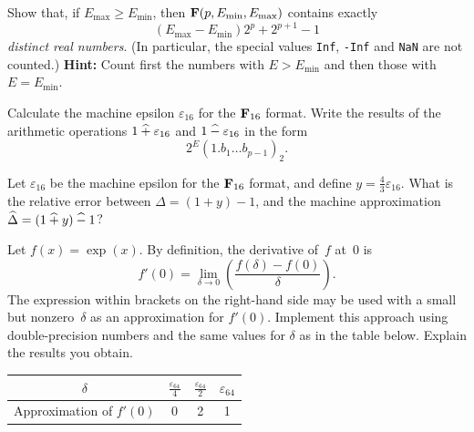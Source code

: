 \begin{exercise}
    \label{exercise:cardinality_floating}
    Show that, if $E_{\max} \geq E_{\min}$, then $\mathbf F(p, E_{\min}, E_{\max})$ contains exactly
    \[
        (E_{\max} - E_{\min}) 2^{p} + 2^{p+1} - 1
    \]
    \emph{distinct real numbers}.
    (In particular, the special values \texttt{Inf}, \texttt{-Inf} and \texttt{NaN} are not counted.)
    \textbf{Hint:} Count first the numbers with $E > E_{\min}$ and then those with $E = E_{\min}$.
\end{exercise}

\begin{exercise}
    Calculate the machine epsilon $\varepsilon_{16}$ for the $\mathbf F_{16}$ format.
    Write the results of the arithmetic operations $1 \mathbin{\widehat +} \varepsilon_{16}$ and $1 \mathbin{\widehat -} \varepsilon_{16}$ in the form
    \[
        2^E (1.b_1 \dotsc b_{p-1})_2.
    \]
\end{exercise}

\begin{exercise}
    Let $\varepsilon_{16}$ be the machine epsilon for the $\mathbf F_{16}$ format,
    and define $y = \frac{4}{3} \varepsilon_{16}$.
    What is the relative error between $\Delta = (1 + y) - 1$,
    and the machine approximation $\widehat \Delta = (1 \mathbin{\widehat +} y) \mathbin{\widehat -} 1$?
\end{exercise}

\begin{compexercise}
    Let $f(x) = \exp(x)$.
    By definition, the derivative of~$f$ at~$0$ is
    \[
        f'(0) = \lim_{\delta \to 0} \left( \frac{f(\delta) - f(0)}{\delta} \right).
    \]
    The expression within brackets on the right-hand side may be used
    with a small but nonzero~$\delta$ as an approximation for $f'(0)$.
    Implement this approach using double-precision numbers and the same values for $\delta$ as in the table below.
    Explain the results you obtain.
    \begin{center}
        \def\arraystretch{1.5}
        \begin{tabular}{|c|c|c|c|}
            \hline
            $\delta$ & $\frac{\varepsilon_{64}}{4} $ & $\frac{\varepsilon_{64}}{2}$ & $\varepsilon_{64}$ \\
            \hline
            Approximation of $f'(0)$ & 0 & 2 & 1 \\
            \hline
        \end{tabular}
    \end{center}
\end{compexercise}

